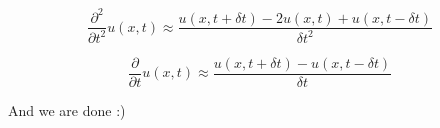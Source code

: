 \begin{equation}
\frac{\partial^2}{\partial t^2} u(x,t) \approx \frac{u(x,t+\delta t) - 2 u(x,t) + u(x,t-\delta t)}{\delta t^2}
\end{equation}

\begin{equation}
\frac{\partial}{\partial t} u(x,t) \approx \frac{u(x,t+\delta t) - u(x,t-\delta t)}{\delta t}
\end{equation}




And we are done :)













